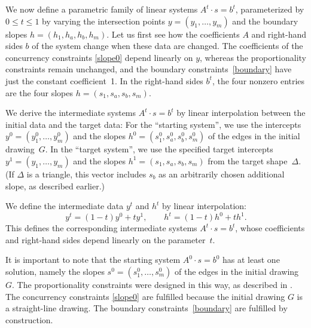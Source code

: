 We now define a parametric family of linear systems
 $A^t\cdot s = b^t$, parameterized by $0\le t\le 1$
 by varying the intersection points $y=(y_1,\ldots,y_m)$
 and the boundary slopes $h=(h_1,h_a,h_b,h_m)$.
 Let us first see how the coefficients $A$ and right-hand sides $b$ of the system change when these data are changed.
 The coefficients of the
 concurrency constraints
 \eqref{slope0} depend linearly on $y$,
 whereas
 the
 proportionality constraints 
 \thetag{\ref{eq:proportion}--\ref{eq:proportion2}} remain unchanged,
 and the boundary constraints~\eqref{boundary} have just the constant coefficient~1.
In the right-hand sides $b^t$,
the four nonzero entries
are the four slopes
$h=(s_1,s_a,s_b,s_m)$.

We derive the intermediate systems 
$A^t\cdot s = b^t$ by linear interpolation between the initial data
and the target data:
For the ``starting system'', we use
the intercepts
 $y^0=(y_1^0,\ldots,y_m^0)$
 and the slopes
 $h^0=(s_1^0,s_a^0,s_b^0,s_m^0)$
 of the edges in the initial drawing~$G$.
In the ``target system'', we use
the specified target intercepts
 $y^1=(y_1,\ldots,y_m)$
 and the slopes
 $h^1=(s_1,s_a,s_b,s_m)$ from the target shape~$\Delta$.
(If $\Delta$ is a triangle, this vector includes $s_b$ as an arbitrarily chosen
additional slope, as described earlier.)

 
We define the intermediate data $y^t$ and $h^t$
by linear interpolation:
\begin{equation*}
  y^t = (1-t)y^0 + ty^1,
  \qquad
  h^t = (1-t)h^0 + th^1.
\end{equation*}
This defines the corresponding intermediate systems 
$A^t\cdot s = b^t$, whose coefficients and right-hand sides depend
linearly on the parameter~$t$.

It is important to note that
the starting system
$A^0\cdot s = b^0$
has at least one solution, %
namely the slopes
$s^0=(s_1^0,\ldots,s_m^0)$
 of the edges in the initial drawing $G$.
 The proportionality constraints
  \thetag{\ref{eq:proportion}--\ref{eq:proportion2}} were designed
  in this way, as described in .
 The
 concurrency constraints
 \eqref{slope0} are fulfilled because the initial drawing $G$ is a
 straight-line drawing.
 The boundary constraints~\eqref{boundary} are fulfilled by
 construction.



